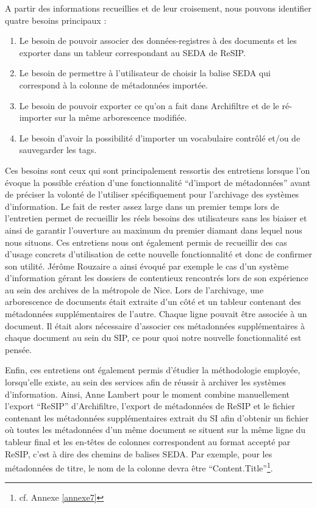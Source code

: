 A partir des informations recueillies et de leur croisement, nous pouvons identifier quatre besoins principaux : 
\begin{enumerate}
	\item Le besoin de pouvoir associer des données-registres à des documents et les exporter dans un tableur correspondant au \gls{SEDA} de ReSIP.
	\item Le besoin de permettre à l’utilisateur de choisir la balise \gls{SEDA} qui correspond à la colonne de métadonnées importée.
	\item Le besoin de pouvoir exporter ce qu’on a fait dans \gls{Archifiltre} et de le ré-importer sur la même arborescence modifiée.
	\item Le besoin d’avoir la possibilité d’importer un vocabulaire contrôlé et/ou de sauvegarder les tags.
\end{enumerate}
Ces besoins sont ceux qui sont principalement ressortis des entretiens lorsque l’on évoque la possible création d’une fonctionnalité \enquote{d’import de métadonnées} avant de préciser la volonté de l’utiliser spécifiquement pour l’archivage des systèmes d’information. Le fait de rester assez large dans un premier temps lors de l’entretien permet de recueillir les réels besoins des utilisateurs sans les biaiser et ainsi de garantir l’ouverture au maximum du premier diamant dans lequel nous nous situons. Ces entretiens nous ont également permis de recueillir des cas d’usage concrets d’utilisation de cette nouvelle fonctionnalité et donc de confirmer son utilité. Jérôme Rouzaire a ainsi évoqué par exemple le cas d’un système d’information gérant les dossiers de contentieux rencontrés lors de son expérience au sein des archives de la métropole de Nice. Lors de l’archivage, une arborescence de documents était extraite d’un côté et un tableur contenant des métadonnées supplémentaires de l’autre. Chaque ligne pouvait être associée à un document. Il était alors nécessaire d’associer ces métadonnées supplémentaires à chaque document au sein du \gls{SIP}, ce pour quoi notre nouvelle fonctionnalité est pensée.

Enfin, ces entretiens ont également permis d’étudier la méthodologie employée, lorsqu’elle existe, au sein des services afin de réussir à archiver les systèmes d’information. Ainsi, Anne Lambert pour le moment combine manuellement l’export \enquote{ReSIP} d’\gls{Archifiltre}, l’export de métadonnées de ReSIP et le fichier contenant les métadonnées supplémentaires extrait du \gls{SI} afin d’obtenir un fichier où toutes les métadonnées d’un même document se situent sur la même ligne du tableur final et les en-têtes de colonnes correspondent au format accepté par ReSIP, c’est à dire des chemins de balises \gls{SEDA}. Par exemple, pour les métadonnées de titre, le nom de la colonne devra être \enquote{Content.Title}\footnote{cf. Annexe \ref{annexe7}}. 


